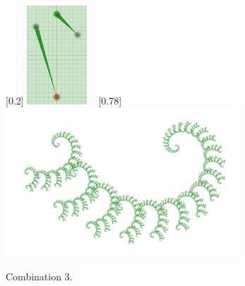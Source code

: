            \begin{figure}[H]
                \centering
                \caption{\label{ray_05} Combination 3.}
                [0.2\textwidth]
                    {\includegraphics[width=0.2\textwidth]{img/Simple_Techniques/Cases/rays/ray_set_05.png}}
                ~
                [0.78\textwidth]
                    {\includegraphics[width=0.78\textwidth]{img/Simple_Techniques/Cases/rays/ray_05.png}}
            \end{figure}

            


